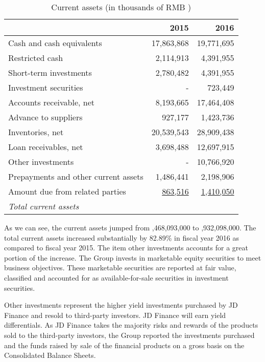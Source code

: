 \begin{table}[H]	
\begin{center}
	\begin{tabular}{lrr}
		\toprule
		&\textbf{2015}&\textbf{2016}\\
		\midrule
		Cash and cash equivalents&17,863,868&19,771,695\\
		Restricted cash&2,114,913&4,391,955\\
		Short-term investments&2,780,482&4,391,955\\
		Investment securities&-&723,449\\
		Accounts receivable, net&8,193,665&17,464,408\\
		Advance to suppliers&927,177&1,423,736\\
		Inventories, net&20,539,543&28,909,438\\
		Loan receivables, net&3,698,488&12,697,915\\
		Other investments&-&10,766,920\\
		Prepayments and other current assets&1,486,441&2,198,906\\
		Amount due from related parties&\underline{863,516}&\underline{1,410,050}\\
		\qquad\emph{Total current assets}&\uuline{58,468,093}&\uuline{106,932,098}\\
		\bottomrule
	\end{tabular}
\end{center}
	\caption{Current assets (in thousands of RMB \textyen)}\label{table:1}
\end{table}
As we can see, the current assets jumped from ,468,093,000 to ,932,098,000. The total current assets increased substantially by 82.89\% in fiscal year 2016 as compared to fiscal year 2015. The item other investments accounts for a great portion of the increase. The Group invests in marketable equity securities to meet business objectives. These marketable securities are reported at fair value, classified and
accounted for as available-for-sale securities in investment securities.

Other investments represent the higher yield investments purchased by JD Finance and resold to third-party investors. JD Finance will earn yield
differentials. As JD Finance takes the majority risks and rewards of the products sold to the third-party investors, the Group reported the investments
purchased and the funds raised by sale of the financial products on a gross basis on the Consolidated Balance Sheets. 

